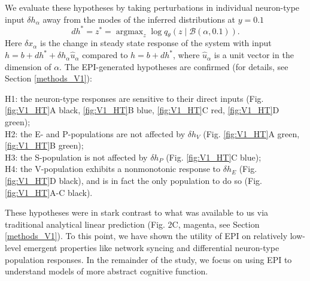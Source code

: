 \documentclass[11pt]{article}
\DeclareMathOperator*{\argmax}{argmax}
\begin{document}
We evaluate these hypotheses by taking perturbations in individual neuron-type input $\delta h_\alpha$ away from the modes of the inferred distributions at $y=0.1$
\begin{equation}
dh^* = z^* = \argmax_{z} \log q_\theta(z \mid \mathcal{B}(\alpha, 0.1)).
\end{equation}
Here $\delta x_{\alpha}$ is the change in steady state response of the system with input $h = b + dh^* + \delta h_\alpha \hat{u}_\alpha$ compared to $h = b + dh^*$, where $\hat{u}_\alpha$ is a unit vector in the dimension of $\alpha$. The EPI-generated  hypotheses are confirmed (for details, see Section \ref{methods_V1}): 

{\addtolength{\leftskip}{10 mm}
H1: the neuron-type responses are sensitive to their direct inputs (Fig. \ref{fig:V1_HT}A black, \ref{fig:V1_HT}B blue, \ref{fig:V1_HT}C red, \ref{fig:V1_HT}D green); \\
H2: the E- and P-populations are not affected by $\delta h_V$ (Fig. \ref{fig:V1_HT}A green, \ref{fig:V1_HT}B green); \\
H3: the S-population is not affected by $\delta h_P$ (Fig. \ref{fig:V1_HT}C blue); \\
H4: the V-population exhibits a nonmonotonic response to $\delta h_E$ (Fig. \ref{fig:V1_HT}D black), and is in fact the only population to do so (Fig. \ref{fig:V1_HT}A-C black).

}

These hypotheses were in stark contrast to what was available to us via traditional analytical linear prediction (Fig. 2C, magenta, see Section \ref{methods_V1}).
To this point, we have shown the utility of EPI on relatively low-level emergent properties like network syncing and differential neuron-type population responses.  
In the remainder of the study, we focus on using EPI to understand models of more abstract cognitive function.

\end{document}
